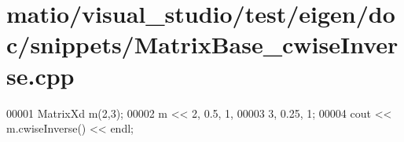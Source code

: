 \hypertarget{matio_2visual__studio_2test_2eigen_2doc_2snippets_2_matrix_base__cwise_inverse_8cpp_source}{}\section{matio/visual\+\_\+studio/test/eigen/doc/snippets/\+Matrix\+Base\+\_\+cwise\+Inverse.cpp}
\label{matio_2visual__studio_2test_2eigen_2doc_2snippets_2_matrix_base__cwise_inverse_8cpp_source}

\begin{DoxyCode}
00001 MatrixXd m(2,3);
00002 m << 2, 0.5, 1,   
00003      3, 0.25, 1;
00004 cout << m.cwiseInverse() << endl;
\end{DoxyCode}
